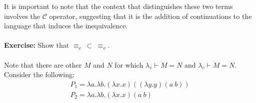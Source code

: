 \documentclass[a4paper,10pt]{article}
\begin{document}
It is important to note that the context that distinguishes these two terms involves the $\mathcal{C}$
operator, suggesting that it is the addition of continuations to the language that induces
the inequivalence.\\
\\
\textbf{Exercise:} Show that $\equiv_c\ \subset\ \equiv_v$.\\
\\
Note that there are other $M$ and $N$ for which $\lambda_v \vdash M = N$ and $\lambda_c \vdash M = N$.
Consider the following:\\

\begin{eqnarray}
 P_1 = \lambda a . \lambda b . (\lambda x . x) ((\lambda y . y) (a\ b))\\
%
P_2 = \lambda a . \lambda b . (\lambda x . x) (a\ b)
\end{eqnarray}
\end{document}
